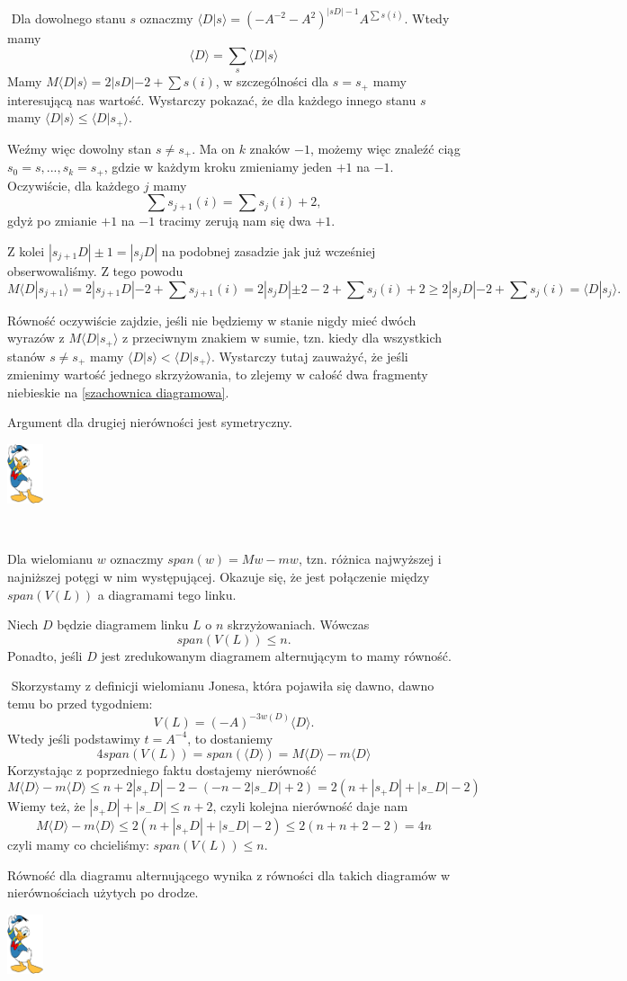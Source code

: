 \documentclass{article}
\renewenvironment{proof}{{\bfseries\color{orange} Dowód}$ $\newline}{
  \begin{flushright}\includegraphics[width=30pt]{Donald_Duck.png}\end{flushright}$ $\newline
}
\begin{document}
\begin{proof}
  Dla dowolnego stanu $s$ oznaczmy $\langle D|s\rangle=(-A^{-2}-A^2)^{|sD|-1}A^{\sum s(i)}$. Wtedy mamy 
  $$\langle D\rangle = \sum_s \langle D|s\rangle$$
  Mamy $M\langle D|s\rangle=2|sD|-2+\sum s(i)$, w szczególności dla $s=s_+$ mamy interesującą nas wartość. Wystarczy pokazać, że dla każdego innego stanu $s$ mamy $\langle D|s\rangle \leq \langle D|s_+\rangle$.

  Weźmy więc dowolny stan $s\neq s_+$. Ma on $k$ znaków $-1$, możemy więc znaleźć ciąg $s_0=s,...,s_k=s_+$, gdzie w każdym kroku zmieniamy jeden $+1$ na $-1$. Oczywiście, dla każdego $j$ mamy 
  $$\sum s_{j+1}(i)=\sum s_j(i)+2,$$
  gdyż po zmianie $+1$ na $-1$ tracimy zerują nam się dwa $+1$.

  Z kolei $|s_{j+1}D|\pm 1=|s_jD|$ na podobnej zasadzie jak już wcześniej obserwowaliśmy. Z tego powodu 
  $$M\langle D|s_{j+1}\rangle =2|s_{j+1}D|-2+\sum s_{j+1}(i)=2|s_jD|\pm 2-2+\sum s_j(i)+2\geq 2|s_jD|-2+\sum s_j(i)=\langle D|s_j\rangle.$$

  Równość oczywiście zajdzie, jeśli nie będziemy w stanie nigdy mieć dwóch wyrazów z $M\langle D|s_+\rangle$ z przeciwnym znakiem w sumie, tzn. kiedy dla wszystkich stanów $s\neq s_+$ mamy $\langle D|s\rangle < \langle D|s_+\rangle$. Wystarczy tutaj zauważyć, że jeśli zmienimy wartość jednego skrzyżowania, to zlejemy w całość dwa fragmenty niebieskie na \cref{szachownica diagramowa}.

  Argument dla drugiej nierówności jest symetryczny.
\end{proof}


Dla wielomianu $w$ oznaczmy $span(w)=Mw-mw$, tzn. różnica najwyższej i najniższej potęgi w nim występującej. Okazuje się, że jest połączenie między $span(V(L))$ a diagramami tego linku.

\begin{thm}
  Niech $D$ będzie diagramem linku $L$ o $n$ skrzyżowaniach. Wówczas
  $$span(V(L))\leq n.$$
  Ponadto, jeśli $D$ jest zredukowanym diagramem alternującym to mamy równość.
\end{thm}

\begin{proof}
  Skorzystamy z definicji wielomianu Jonesa, która pojawiła się dawno, dawno temu bo przed tygodniem:
  $$V(L)=(-A)^{-3w(D)}\langle D\rangle.$$
  Wtedy jeśli podstawimy $t=A^{-4}$, to dostaniemy
  $$4span(V(L))=span(\langle D\rangle)=M\langle D\rangle-m\langle D\rangle$$
  Korzystając z poprzedniego faktu dostajemy nierówność
  $$M\langle D\rangle -m\langle D\rangle\leq n+2|s_+D|-2-(-n-2|s_-D|+2)=2(n+|s_+D|+|s_-D|-2)$$
  Wiemy też, że $|s_+D|+|s_-D|\leq n+2$, czyli kolejna nierówność daje nam 
  $$M\langle D\rangle -m\langle D\rangle \leq 2(n+|s_+D|+|s_-D|-2)\leq 2(n+n+2-2)=4n$$
  czyli mamy co chcieliśmy: $span(V(L))\leq n$.

  Równość dla diagramu alternującego wynika z równości dla takich diagramów w nierównościach użytych po drodze.
\end{proof}
\end{document}
